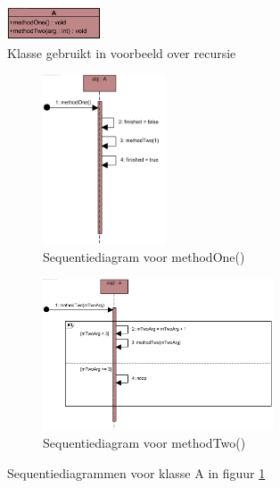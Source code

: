 	\begin{figure}[h]
		\centering
		\includegraphics[width=0.25\textwidth]{chap-gedrag/recursion-class.png}
		\caption{Klasse gebruikt in voorbeeld over recursie}
		\label{fig:recursion-class}
	\end{figure}
\begin{landscape}
\thispagestyle{plain}
	\begin{figure}
		\centering
		\begin{subfigure}{\textwidth}
			\includegraphics[width=0.4\textwidth]{chap-gedrag/methodOne.png}
			\caption{Sequentiediagram voor methodOne()}
			\label{fig:methodOne}
		\end{subfigure}%
		\begin{subfigure}{\textwidth}
			\includegraphics[width=0.75\textwidth]{chap-gedrag/methodTwo.png}
			\caption{Sequentiediagram voor methodTwo()}
			\label{fig:methodtwo}
		\end{subfigure}
		\caption{Sequentiediagrammen voor klasse A in figuur \ref{fig:recursion-class}}
		\label{fig:seq-recursion}
	\end{figure}
\end{landscape}

